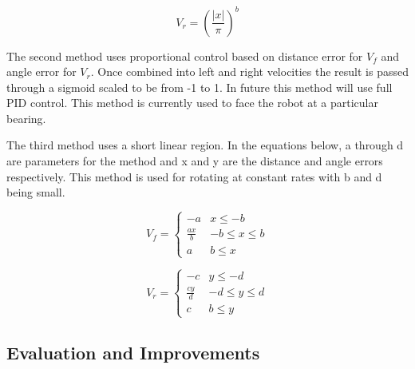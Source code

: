 \begin{equation}
    V_r = (\frac{|x|}{\pi})^b
\end{equation}

The second method uses proportional control based on distance error for $V_f$ and angle error for $V_r$. Once combined into left and right velocities the result is passed through a sigmoid scaled to be from -1 to 1. In future this method will use full PID control. This method is currently used to face the robot at a particular bearing.

The third method uses a short linear region. In the equations below, a through d are parameters for the method and x and y are the distance and angle errors respectively. This method is used for rotating at constant rates with b and d being small.

\begin{equation}
    V_f = 
    \begin{cases} 
      -a & x\leq -b \\
      \frac{ax}{b} & -b \leq x\leq b \\
      a & b \leq x 
   \end{cases}
\end{equation}

\begin{equation}
    V_r = 
    \begin{cases} 
      -c & y \leq -d \\
      \frac{cy}{d} & -d \leq y \leq d \\
      c & b \leq y 
   \end{cases}
\end{equation}


%     



\subsection{Evaluation and Improvements}



